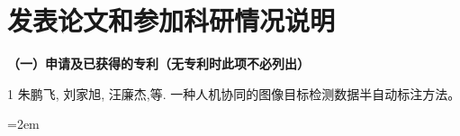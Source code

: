 
\chapter*{发表论文和参加科研情况说明}
\setlength{\parindent}{0em}

\vspace*{1em}
\textbf{（一）申请及已获得的专利（无专利时此项不必列出）}
\begin{publist}
\item [1]朱鹏飞, 刘家旭, 汪廉杰,等. 一种人机协同的图像目标检测数据半自动标注方法。
\end{publist}
\vspace*{1em}
\vfill
{}\hangindent=2em\noindent

\setlength{\parindent}{2em}